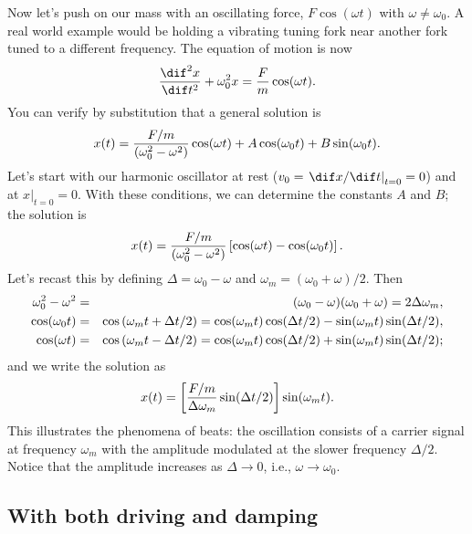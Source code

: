 Now let's push on our mass with an oscillating force, $F\cos(\omega t)$ with $\omega\neq\omega_{0}$. A real world example would be holding a vibrating tuning fork near another fork tuned to a different frequency.  The equation of motion is now
\begin{equation}\label{e.SHO-driven}
	\DDtt{x} + \omega_{0}^{2}x = \frac{F}{m}\cos(\wt).
\end{equation}
You can verify by substitution that a general solution is
\[
	x(t) = \frac{F/m}{(\omega_{0}^{2}-\omega^{2})}\cos(\omega t) + A\cos(\omega_{0} t)+B\sin(\omega_{0} t).
\]
Let's start with our harmonic oscillator at rest ($v_{0} = \left.\dif x/\dif t\right|_{t=0} = 0$) and at $\left. x\right|_{t=0} = 0$.  With these conditions, we can determine the constants $A$ and $B$; the solution is
\[
	x(t) = \frac{F/m}{(\omega_{0}^{2}-\omega^{2})}\left[\cos(\omega t)-\cos(\omega_{0} t)\right].
\]
Let's recast this by defining $\Delta = \omega_{0} - \omega$ and $\omega_{m} = (\omega_{0}+\omega)/2$.  Then
\begin{eqnarray*}
  \omega_{0}^{2}-\omega^{2} &=& (\omega_{0}-\omega)(\omega_{0}+\omega) = 2\Delta\omega_{m},\\
  \cos(\omega_{0} t) &=& \cos\left(\omega_{m} t+\Delta t/2\right) = \cos(\omega_{m} t)\cos(\Delta t/2) - \sin(\omega_{m} t)\sin(\Delta t/2),\\
  \cos(\omega t) &=& \cos\left(\omega_{m} t-\Delta t/2\right) = \cos(\omega_{m} t)\cos(\Delta t/2) + \sin(\omega_{m} t)\sin(\Delta t/2);
\end{eqnarray*}
and we write the solution as
\begin{equation}\label{e.beats}
	x(t) = \left[\frac{F/m}{\Delta\omega_{m}}\sin(\Delta t/2)\right]\sin(\omega_{m} t).
\end{equation}
This illustrates the phenomena of beats: the oscillation consists of a carrier signal at frequency $\omega_{m}$ with the amplitude modulated at the slower frequency $\Delta /2$.  Notice that the amplitude increases as $\Delta \to0$, i.e., $\omega\to\omega_{0}$.

\subsection{With both driving and damping}

